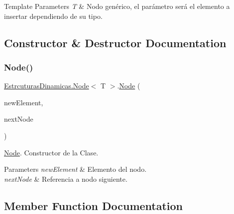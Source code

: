 \begin{DoxyTemplParams}{Template Parameters}
{\em T} & Nodo genérico, el parámetro será el elemento a insertar dependiendo de su tipo.\\
\hline
\end{DoxyTemplParams}


\subsection{Constructor \& Destructor Documentation}
\mbox{\label{class_estrcuturas_dinamicas_1_1_node_aadac6302fd412298209a5e066beb127f}} 
\subsubsection{\texorpdfstring{Node()}{Node()}}
{\footnotesize\ttfamily \mbox{\hyperlink{class_estrcuturas_dinamicas_1_1_node}{Estrcuturas\+Dinamicas.\+Node}}$<$ T $>$.\mbox{\hyperlink{class_estrcuturas_dinamicas_1_1_node}{Node}} (\begin{DoxyParamCaption}\item[{T}]{new\+Element,  }\item[{\mbox{\hyperlink{class_estrcuturas_dinamicas_1_1_node}{Node}}$<$ T $>$}]{next\+Node }\end{DoxyParamCaption})}



\mbox{\hyperlink{class_estrcuturas_dinamicas_1_1_node}{Node}}. Constructor de la Clase. 


\begin{DoxyParams}{Parameters}
{\em new\+Element} & Elemento del nodo.\\
\hline
{\em next\+Node} & Referencia a nodo siguiente.\\
\hline
\end{DoxyParams}


\subsection{Member Function Documentation}
\mbox{\label{class_estrcuturas_dinamicas_1_1_node_a98a8fbb4ded20ee02d91d2982c094dc2}} 

